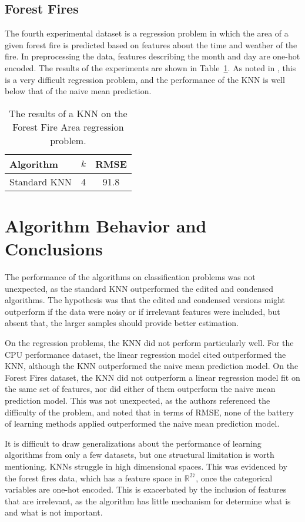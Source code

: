 \documentclass{amsart}
\begin{document}
    \subsection*{Forest Fires}
    The fourth experimental dataset is a regression problem in which the area of a given
    forest fire is predicted based on features about the time and weather of the fire\cite{ff_dataset}.
    In preprocessing the data, features describing the month and day are one-hot encoded.
    The results of the experiments are shown in Table~\ref{fire_forest_area}.
    As noted in \cite{ff_dataset}, this is a very difficult regression problem, and the performance
    of the KNN is well below that of the naive mean prediction.
    \begin{table}[H]
    \begin{tabular}{lcc}
        Algorithm     & $k$ & RMSE \\
        \hline
        Standard KNN  & 4 & 91.8
    \end{tabular}
    \label{fire_forest_area}
    \caption{The results of a KNN on the Forest Fire Area regression problem.}
    \end{table}

    \section{Algorithm Behavior and Conclusions}
    The performance of the algorithms on classification problems was not unexpected,
    as the standard KNN outperformed the edited and condensed algorithms. The hypothesis
    was that the edited and condensed versions might outperform if the data were noisy or if
    irrelevant features were included, but absent that, the larger samples should provide better
    estimation.

    On the regression problems, the KNN did not perform particularly well. For the
    CPU performance dataset, the linear regression model cited\cite{cpu_dataset}
    outperformed the KNN, although the KNN outperformed the naive mean prediction model.
    On the Forest Fires dataset\cite{ff_dataset}, the KNN did not outperform a linear regression
    model fit on the same set of features, nor did either of them outperform the
    naive mean prediction model. This was not unexpected, as the authors referenced the
    difficulty of the problem, and noted that in terms of RMSE, none of the battery of
    learning methods applied outperformed the naive mean prediction model.

    It is difficult to draw generalizations about the performance of learning
    algorithms from only a few datasets, but one structural limitation is worth
    mentioning. KNNs struggle in high dimensional spaces. This was evidenced by the forest fires
    data, which has a feature space in $\mathbb{R}^{27}$, once the categorical
    variables are one-hot encoded. This is exacerbated by the inclusion of features that
    are irrelevant, as the algorithm has little mechanism for determine
    what is and what is not important.
\end{document}
